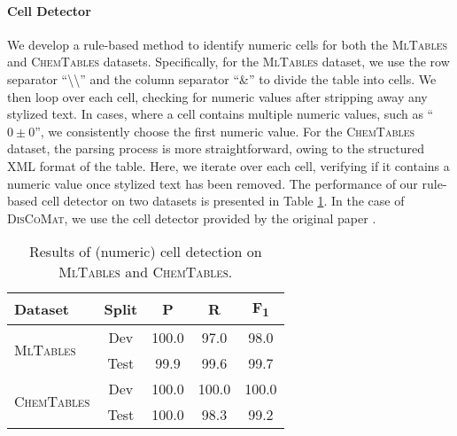 \documentclass[11pt]{article}
\newcommand\data{\textsc{MlTables}}
\newcommand{\chemtables}{\textsc{ChemTables}}
\newcommand{\discomat}{\textsc{DisCoMat}}
\begin{document}
\paragraph{Cell Detector} We develop a rule-based method to identify numeric cells for both the \data{} and \chemtables{} datasets. Specifically, for the \data{} dataset, we use the row separator ``\textbackslash\textbackslash'' and the column separator ``\&'' to divide the table into cells. We then loop over each cell, checking for numeric values after stripping away any stylized text. In cases, where a cell contains multiple numeric values, such as ``$0 \pm 0$'', we consistently choose the first numeric value. For the \chemtables{} dataset, the parsing process is more straightforward, owing to the structured XML format of the table. Here, we iterate over each cell, verifying if it contains a numeric value once stylized text has been removed. The performance of our rule-based cell detector on two datasets is presented in Table \ref{tab:cell_detect}. In the case of \discomat{}, we use the cell detector provided by the original paper \citet{gupta2022discomat}.


\begin{table}[h!]
\small
\begin{center}
\begin{tabular}{lcccc}
\toprule
\textbf{Dataset} & \textbf{Split} & \textbf{P} & \textbf{R} & \textbf{F\textsubscript{1}} \\
\midrule

\multirow{2}{*}{\data{}} & Dev & 100.0 & 97.0 & 98.0 \\
 & Test & 99.9 & 99.6 & 99.7 \\

\midrule

\multirow{2}{*}{\chemtables{}} & Dev & 100.0 & 100.0 & 100.0 \\
 & Test & 100.0 & 98.3 & 99.2 \\

\bottomrule
\end{tabular}
\end{center}
\caption{\label{tab:cell_detect} Results of (numeric) cell detection on \data{} and \chemtables{}.
}
\end{table}
\end{document}

